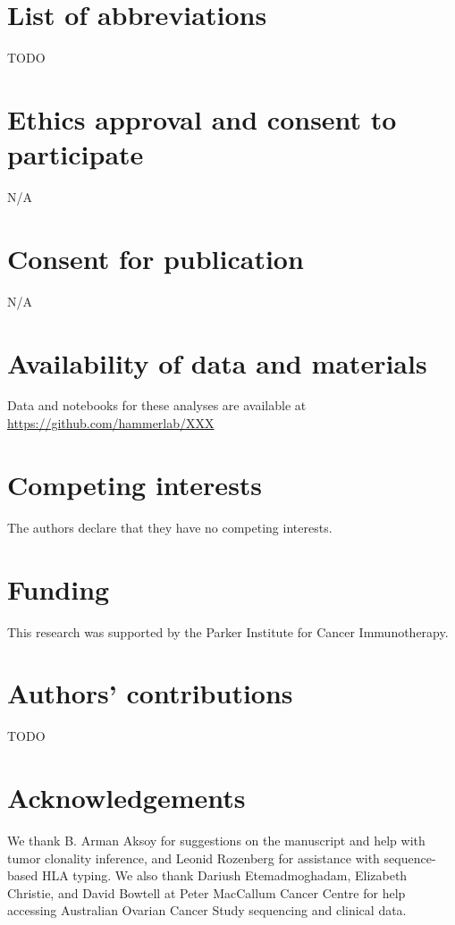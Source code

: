 \section{List of abbreviations}
TODO

\section{Ethics approval and consent to participate}
N/A

\section{Consent for publication}
N/A

\section{Availability of data and materials}
Data and notebooks for these analyses are available at \url{https://github.com/hammerlab/XXX}

\section{Competing interests}
The authors declare that they have no competing interests.

\section{Funding}
This research was supported by the Parker Institute for Cancer Immunotherapy.

\section{Authors' contributions}
TODO

\section{Acknowledgements}
We thank B. Arman Aksoy for suggestions on the manuscript and help with tumor clonality inference, and Leonid Rozenberg for assistance with sequence-based HLA typing. We also thank Dariush Etemadmoghadam, Elizabeth Christie, and David Bowtell at Peter MacCallum Cancer Centre for help accessing Australian Ovarian Cancer Study sequencing and clinical data.
